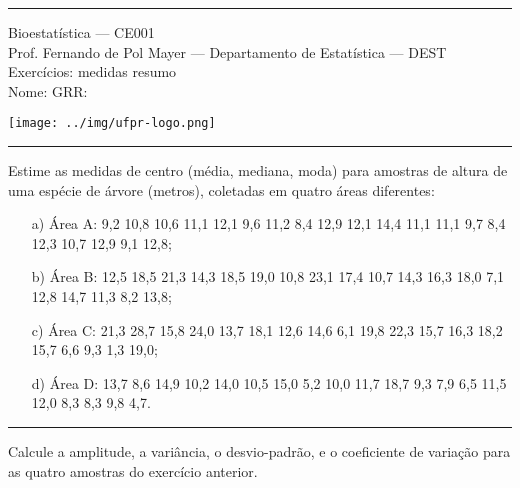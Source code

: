 \documentclass[a4paper,11pt,fleqn]{article}\usepackage[]{graphicx}\usepackage[]{color}
\theoremstyle{definition}
\begin{document}
\reversemarginpar %





\hrule
\vspace{0.3cm}

\begin{minipage}[c]{.85\textwidth}
  Bioestatística --- CE001 \\
  Prof. Fernando de Pol Mayer --- Departamento de Estatística --- DEST \\
  Exercícios: medidas resumo \\
  Nome:   \hfill GRR: \hspace{2cm}
\end{minipage}\hfill
\begin{minipage}[c]{.15\textwidth}
\flushright
\texttt{[image: ../img/ufpr-logo.png]}
\end{minipage}

\vspace{0.3cm}
\hrule
\vspace{0.3cm}

\begin{compactenum}[1.]
\item Estime as medidas de centro (média, mediana,
  moda) para amostras de altura de uma espécie de árvore (metros),
  coletadas em quatro áreas diferentes:
  \begin{itemize}
  \item[a)] Área A: 9,2 10,8 10,6 11,1 12,1 9,6 11,2 8,4 12,9 12,1
    14,4 11,1 11,1 9,7 8,4 12,3 10,7 12,9 9,1 12,8;
  \item[b)] Área B: 12,5 18,5 21,3 14,3 18,5 19,0 10,8 23,1 17,4 10,7
    14,3 16,3 18,0 7,1 12,8 14,7 11,3 8,2 13,8;
  \item[c)] Área C: 21,3 28,7 15,8 24,0 13,7 18,1 12,6 14,6 6,1 19,8
    22,3 15,7 16,3 18,2 15,7 6,6 9,3 1,3 19,0;
  \item[d)] Área D: 13,7 8,6 14,9 10,2 14,0 10,5 15,0 5,2 10,0 11,7
    18,7 9,3 7,9 6,5 11,5 12,0 8,3 8,3 9,8 4,7.
  \end{itemize}

\end{compactenum}

\vspace{0.3cm}
\hrule
\vspace{0.3cm}

\begin{compactenum}[2.]
\item Calcule a amplitude, a variância, o desvio-padrão, e o coeficiente
  de variação para as quatro amostras do exercício anterior.

\end{compactenum}
\end{document}
